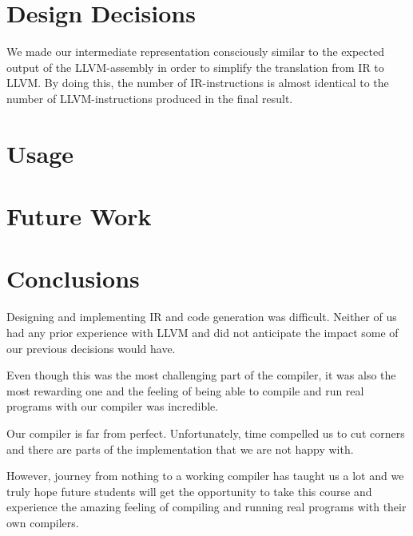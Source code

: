 
\section{Design Decisions}

We made our intermediate representation consciously similar to the expected output of the LLVM-assembly in order to simplify the translation from IR to LLVM. By doing this, the number of IR-instructions is almost identical to the number of LLVM-instructions produced in the final result.



\section{Usage}

\section{Future Work}

\section{Conclusions}

Designing and implementing IR and code generation was difficult. Neither of us had any prior experience with LLVM and did not anticipate the impact some of our previous decisions would have.

Even though this was the most challenging part of the compiler, it was also the most rewarding one and the feeling of being able to compile and run real programs with our compiler was incredible.

Our compiler is far from perfect. Unfortunately, time compelled us to cut corners and there are parts of the implementation that we are not happy with.

However, journey from nothing to a working compiler has taught us a lot and we truly hope future students will get the opportunity to take this course and experience the amazing feeling of compiling and running real programs with their own compilers.

